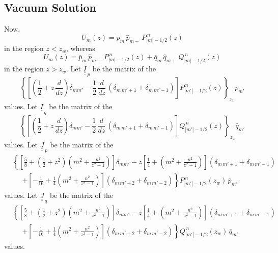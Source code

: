 \documentclass[12pt,prb,aps,notitlepage]{revtex4-1}
\begin{document}
\subsection{Vacuum Solution}
Now, 
\begin{equation}
U_m(z) = \bar{p}_m\,\hat{p}_{m-}\,P_{|m|-1/2}^{\,n}(z)
\end{equation}
in the region $z<z_w$, whereas 
\begin{equation}
U_m(z) = \bar{p}_m\,\hat{p}_{m+}\,P_{|m|-1/2}^{\,n}(z) + \bar{q}_m\,\hat{q}_{m+}\,Q_{|m|-1/2}^{\,n}(z) 
\end{equation}
in the region $z>z_w$. 
Let $\underline{\underline{I}}_{\,p}$ be the matrix of the
\begin{equation}
\left\{\left[\left(\frac{1}{2}+z\,\frac{d}{dz}\right)\delta_{mm'}-\frac{1}{2}\,\frac{d}{dz}\,(\delta_{m\,m'+1}+\delta_{m\,m'-1})\right]P_{|m'|-1/2}^{\,n}(z)\right\}_{z_w}\bar{p}_{m'}
\end{equation}
values.
Let $\underline{\underline{I}}_{\,q}$ be the matrix of the
\begin{equation}
\left\{\left[\left(\frac{1}{2}+z\,\frac{d}{dz}\right)\delta_{mm'}-\frac{1}{2}\,\frac{d}{dz}\,(\delta_{m\,m'+1}+\delta_{m\,m'-1})\right]Q_{|m'|-1/2}^{\,n}(z)\right\}_{z_w}\bar{q}_{m'}
\end{equation}
values. 
Let $\underline{\underline{J}}_{\,p}$ be the matrix of the 
\begin{align}
 &\left\{\left[\frac{5}{8} + \left(\frac{1}{2}+z^2\right)\left(m^2+\frac{n^2}{z^2-1}\right)\right]\delta_{mm'}
-z\left[\frac{1}{4}+ \left(m^2+\frac{n^2}{z^2-1}\right)\right](\delta_{m\,m'+1}+\delta_{m\,m'-1})\right.\nonumber\\[0.5ex]
&\phantom{=}\left.+\left[-\frac{1}{16}+\frac{1}{4} \left(m^2+\frac{n^2}{z^2-1}\right)\right](\delta_{m\,m'+2}+\delta_{m\,m'-2})\right\}P_{|m'|-1/2}^{\,n}(z_w)\,\bar{p}_{m'}
\end{align}
values. Let $\underline{\underline{J}}_{\,q}$ be the matrix of the 
\begin{align}
 &\left\{\left[\frac{5}{8} + \left(\frac{1}{2}+z^2\right)\left(m^2+\frac{n^2}{z^2-1}\right)\right]\delta_{mm'}
-z\left[\frac{1}{4}+ \left(m^2+\frac{n^2}{z^2-1}\right)\right](\delta_{m\,m'+1}+\delta_{m\,m'-1})\right.\nonumber\\[0.5ex]
&\phantom{=}\left.+\left[-\frac{1}{16}+\frac{1}{4} \left(m^2+\frac{n^2}{z^2-1}\right)\right](\delta_{m\,m'+2}+\delta_{m\,m'-2})\right\}Q_{|m'|-1/2}^{\,n}(z_w)\,\bar{q}_{m'}
\end{align}
values. 
\end{document}
